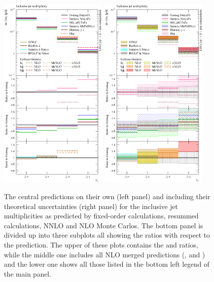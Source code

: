 \begin{figure}[t!]
  \centering
  \includegraphics[width=0.47\textwidth]{figures/hjetscomp_u_NJet_incl_30.pdf}
  \hfill
  \includegraphics[width=0.47\textwidth]{figures/hjetscomp_NJet_incl_30.pdf}
  \caption{\label{fig:hjetscomp:results:inclobs:njets}%
    The central predictions on their own (left panel) and including their
    theoretical uncertainties (right panel) for the inclusive jet
    multiplicities as predicted by fixed-order calculations, resummed
    calculations, NNLO and NLO Monte Carlos. The bottom panel is
    divided up into three subplots all showing the ratios with respect
    to the \Powheg \NNLOPS prediction. The upper of these plots
    contains the \Hej and \Sherpa \NNLOPS ratios, while the middle one
    includes all NLO merged predictions (\MGaMC, \Herwig and \Sherpa)
    and the lower one shows all those listed in the bottom left legend
    of the main panel.}
\end{figure}

